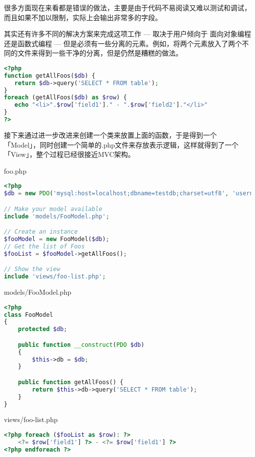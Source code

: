 很多方面现在来看都是错误的做法，主要是由于代码不易阅读又难以测试和调试，而且如果不加以限制，实际上会输出非常多的字段。

其实还有许多不同的解决方案来完成这项工作 — 取决于用户倾向于 面向对象编程还是函数式编程 — 但是必须有一些分离的元素。例如，将两个元素放入了两个不同的文件来得到一些干净的分离，但是仍然是糟糕的做法。

\begin{lstlisting}[language=PHP]
<?php
function getAllFoos($db) {
   return $db->query('SELECT * FROM table');
}
foreach (getAllFoos($db) as $row) {
   echo "<li>".$row['field1']." - ".$row['field2']."</li>"
}
?>
\end{lstlisting}

接下来通过进一步改进来创建一个类来放置上面的函数，于是得到一个「Model」，同时创建一个简单的.php文件来存放表示逻辑，这样就得到了一个「View」，整个过程已经很接近MVC架构。

\begin{compactitem}
\item foo.php

\begin{lstlisting}[language=PHP]
<?php
$db = new PDO('mysql:host=localhost;dbname=testdb;charset=utf8', 'username', 'password');

// Make your model available
include 'models/FooModel.php';

// Create an instance
$fooModel = new FooModel($db);
// Get the list of Foos
$fooList = $fooModel->getAllFoos();

// Show the view
include 'views/foo-list.php';
\end{lstlisting}

\item models/FooModel.php

\begin{lstlisting}[language=PHP]
<?php
class FooModel
{
    protected $db;

    public function __construct(PDO $db)
    {
        $this->db = $db;
    }

    public function getAllFoos() {
        return $this->db->query('SELECT * FROM table');
    }
}
\end{lstlisting}

\item views/foo-list.php

\begin{lstlisting}[language=PHP]
<?php foreach ($fooList as $row): ?>
    <?= $row['field1'] ?> - <?= $row['field1'] ?>
<?php endforeach ?>
\end{lstlisting}

\end{compactitem}

